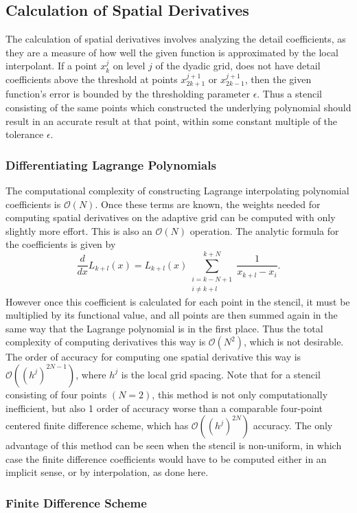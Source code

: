 \documentclass[11pt]{article}
\begin{document}
\subsection{Calculation of Spatial Derivatives}
The calculation of spatial derivatives involves analyzing the detail coefficients, as they are a measure of how well the 
given function is approximated by the local interpolant. If a point $x_{k}^{j}$ on level $j$ of the dyadic grid, does not have 
detail coefficients above the threshold at points $x_{2k+1}^{j+1}$ or $x_{2k-1}^{j+1}$, then the given function's error is
bounded by the thresholding parameter $\epsilon$.  Thus a stencil consisting of the same points
which constructed the underlying polynomial should result in an accurate result at that point, 
within some constant multiple of the tolerance $\epsilon$.

\subsubsection{Differentiating Lagrange Polynomials} 
The computational complexity of constructing Lagrange interpolating polynomial coefficients is $\mathcal{O}(N)$. 
Once these terms are known, the weights needed for computing spatial derivatives on the adaptive grid can be computed with only slightly more effort. This is also an $\mathcal{O}(N)$ operation. 
The analytic formula for the coefficients is given by
\begin{equation}
    \frac{d}{dx} L_{k+l}(x) = L_{k+l}(x) \sum_{ \substack{ i=k-N+1 \\ i\neq k+l } }^{k+N} \frac{1}{x_{k+l}-x_i}.
\end{equation}
However once this coefficient is calculated for each point in the stencil, it must be multiplied by its functional value, 
and all points are then summed again in the same way that the Lagrange polynomial is in the first place. 
Thus the total complexity of computing derivatives this way is $\mathcal{O}(N^2)$, which is not desirable. The order of 
accuracy for computing one spatial derivative this way is $\mathcal{O}((h^j)^{2N-1})$, where $h^j$ is the local grid spacing. 
Note that for a stencil consisting of four points $(N=2)$, this method is not only computationally inefficient, but also 1 order 
of accuracy worse than a comparable four-point centered finite difference scheme, which has $\mathcal{O}((h^j)^{2N})$
accuracy. The only advantage of this method can be seen when the stencil is non-uniform, in which case the finite difference 
coefficients would have to be computed either in an implicit sense, or by interpolation, as done here.
\subsubsection{Finite Difference Scheme}
\end{document}
